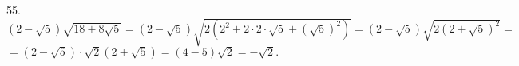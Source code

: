 55. $(2-\sqrt{5})\sqrt{18+8\sqrt{5}}=(2-\sqrt{5})\sqrt{2(2^2+2\cdot2\cdot\sqrt{5}+(\sqrt{5})^2)}=(2-\sqrt{5})\sqrt{2(2+\sqrt{5})^2}=$\\$=
(2-\sqrt{5})\cdot\sqrt{2}(2+\sqrt{5})=(4-5)\sqrt{2}=-\sqrt{2}.$\\
